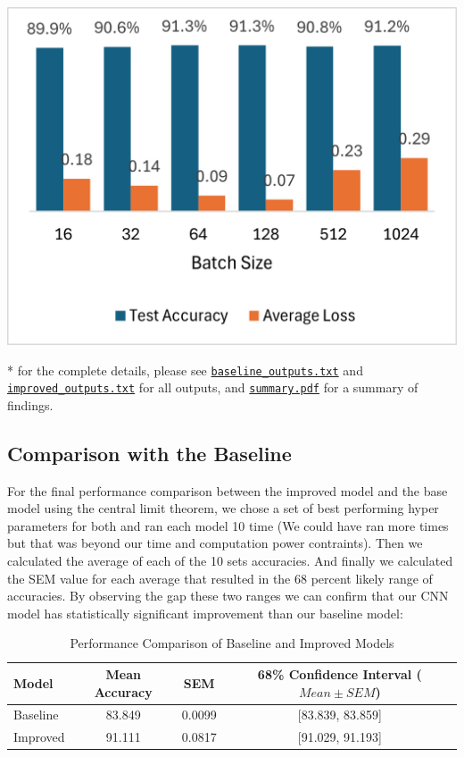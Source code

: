 \documentclass{article}
\begin{document}
\begin{center}
\begin{minipage}{0.3\textwidth}
        \includegraphics[width=\textwidth]{figure/batch_improved.png}
    \end{minipage}
\end{center}
* for the complete details, please see \href{run:https://git.cs.usask.ca/matcrunch/cmpt-423-820-w25-p2/-/raw/solution/baseline_outputs.txt?ref_type=heads}{\texttt{baseline\_outputs.txt}} and \href{run:https://git.cs.usask.ca/matcrunch/cmpt-423-820-w25-p2/-/raw/solution/improved_outputs.txt?ref_type=heads}{\texttt{improved\_outputs.txt}} for all outputs, and \href{run:https://git.cs.usask.ca/matcrunch/cmpt-423-820-w25-p2/-/blob/solution/summary.pdf?ref_type=heads}{\texttt{summary.pdf}} for a summary of findings.


\subsection{Comparison with the Baseline} 
For the final performance comparison between the improved model and the base model using the central limit theorem, we chose a set of best performing hyper parameters for both and ran each model 10 time (We could have ran more times but that was beyond our time and computation power contraints). 
Then we calculated the average of each of the 10 sets accuracies. And finally we calculated the SEM value for each average that resulted in the 68 percent likely range of accuracies. By observing the gap these two ranges we can confirm that our CNN model has statistically significant improvement than our baseline model:


\begin{table}[htbp]
  \centering
  \begin{tabular}{lccc}
    \toprule
    Model & Mean Accuracy & SEM & 68\% Confidence Interval ($Mean \pm SEM$) \\
    \midrule
    Baseline  & 83.849 & 0.0099 & [83.839, 83.859] \\
    Improved  & 91.111 & 0.0817 & [91.029, 91.193] \\
    \bottomrule
  \end{tabular}
  \caption{Performance Comparison of Baseline and Improved Models}
  \label{tab:performance}
\end{table}
\end{document}
